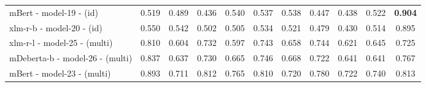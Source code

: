 \begin{tabular}{lcccccccccc}
mBert - model-19 - (id) & 0.519 & 0.489 & 0.436 & 0.540 & 0.537 & 0.538 & 0.447 & 0.438 & 0.522 & \textbf{0.904} \\
xlm-r-b - model-20 - (id) & 0.550 & 0.542 & 0.502 & 0.505 & 0.534 & 0.521 & 0.479 & 0.430 & 0.514 & 0.895 \\
xlm-r-l - model-25 - (multi) & 0.810 & 0.604 & 0.732 & 0.597 & 0.743 & 0.658 & 0.744 & 0.621 & 0.645 & 0.725 \\
mDeberta-b - model-26 - (multi) & 0.837 & 0.637 & 0.730 & 0.665 & 0.746 & 0.668 & 0.722 & 0.641 & 0.641 & 0.767 \\
mBert - model-23 - (multi) & 0.893 & 0.711 & 0.812 & 0.765 & 0.810 & 0.720 & 0.780 & 0.722 & 0.740 & 0.813 \\
\hline
\end{tabular}
